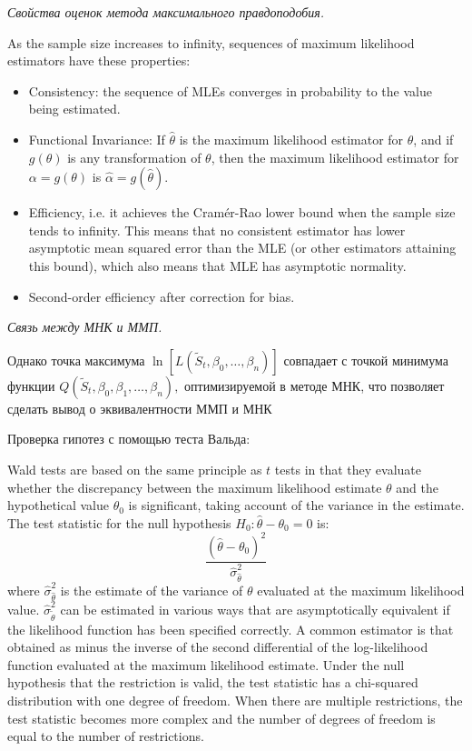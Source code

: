 \documentclass[a4paper,8pt]{article} %
\begin{document}
\textit{Свойства  оценок  метода  максимального правдоподобия.  }

As the sample size increases to infinity, sequences of maximum likelihood estimators have these properties:

\begin{itemize}
	\item  Consistency: the sequence of MLEs converges in probability to the value being estimated.
\item  Functional Invariance: If $\hat{\theta}$ is the maximum likelihood estimator for $\theta$, and if $g(\theta)$ is any transformation of $\theta$, then the maximum likelihood estimator for $\alpha=g(\theta)$ is $\hat{\alpha}=g(\hat{\theta})$.
\item  Efficiency, i.e. it achieves the Cramér-Rao lower bound when the sample size tends to infinity. This means that no consistent estimator has lower asymptotic mean squared error than the MLE (or other estimators attaining this bound), which also means that MLE has asymptotic normality.
\item  Second-order efficiency after correction for bias.
\end{itemize}

\textit{Связь между МНК и ММП.}

Однако точка максимума $\ln \left[L\left(\tilde{S}_{t}, \beta_{0}, \ldots, \beta_{n}\right)\right]$ совпадает с точкой минимума функции $Q\left(\tilde{S}_{t}, \beta_{0}, \beta_{1}, \ldots, \beta_{n}\right),$ оптимизируемой в методе МНК, что позволяет сделать вывод о эквивалентности ММП и МНК


Проверка гипотез  с  помощью  теста  Вальда:  

Wald tests are based on the same principle as $t$ tests in that they evaluate whether the discrepancy between the maximum likelihood estimate $\theta$ and the hypothetical value $\theta_{0}$ is significant, taking account of the variance in the estimate. The test statistic for the null hypothesis $H_{0}: \widehat{\theta}-\theta_{0}=0$ is:
$$
\frac{\left(\widehat{\theta}-\theta_{0}\right)^{2}}{\widehat{\sigma}_{\widehat{\theta}}^{2}}
$$
where $\hat{\sigma}_{\widehat{\theta}}^{2}$ is the estimate of the variance of $\theta$ evaluated at the maximum likelihood value. $\widehat{\sigma}_{\tilde{\theta}}^{2}$ can be estimated in various ways that are asymptotically equivalent if the likelihood function has been specified correctly. A common estimator is that obtained as minus the inverse of the second differential of the log-likelihood function evaluated at the maximum likelihood estimate. Under the null hypothesis that the restriction is valid, the test statistic has a chi-squared distribution with one degree of freedom. When there are multiple restrictions, the test statistic becomes more complex and the number of degrees of freedom is equal to the number of restrictions.
\end{document}
